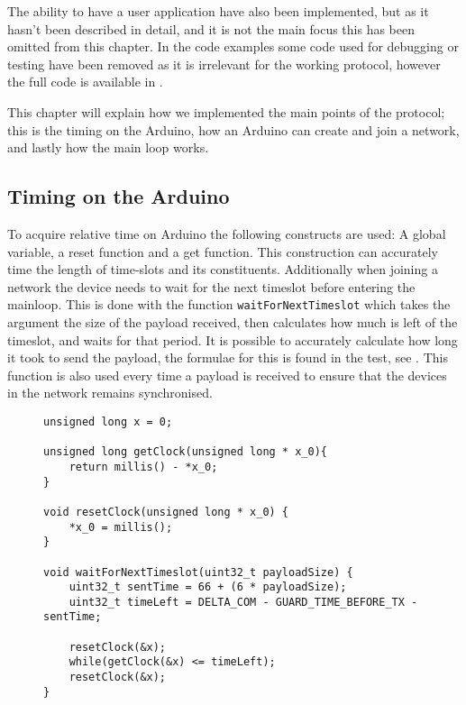 \noindent
The ability to have a user application have also been implemented, but as it hasn't been described in detail, and it is not the main focus this has been omitted from this chapter.
In the code examples some code used for debugging or testing have been removed as it is irrelevant for the working protocol, however the full code is available in . 

This chapter will explain how we implemented the main points of the protocol; this is the timing on the Arduino, how an Arduino can create and join a network, and lastly how the main loop works. 

\subsection{Timing on the Arduino}
To acquire relative time on Arduino the following constructs are used: A global variable, a reset function and a get function. 
This construction can accurately time the length of time-slots and its constituents. 
Additionally when joining a network the device needs to wait for the next timeslot before entering the mainloop. 
This is done with the function \texttt{waitForNextTimeslot} which takes the argument the size of the payload received, then calculates how much is left of the timeslot, and waits for that period. 
It is possible to accurately calculate how long it took to send the payload, the formulae for this is found in the test, see  .
This function is also used every time a payload is received to ensure that the devices in the network remains synchronised. 
\begin{figure}
\begin{lstlisting}[style=customc,caption={The variable and functions used to implement timing.},label={lst:ccrc:timing}]
unsigned long x = 0;

unsigned long getClock(unsigned long * x_0){
    return millis() - *x_0;
}

void resetClock(unsigned long * x_0) {
    *x_0 = millis();
}

void waitForNextTimeslot(uint32_t payloadSize) {
    uint32_t sentTime = 66 + (6 * payloadSize);
    uint32_t timeLeft = DELTA_COM - GUARD_TIME_BEFORE_TX - sentTime;

    resetClock(&x);
    while(getClock(&x) <= timeLeft);
    resetClock(&x);
}

\end{lstlisting}
\vspace{-20pt}
\end{figure}

